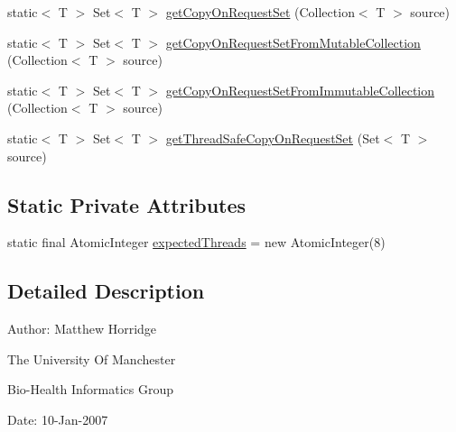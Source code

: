 \begin{DoxyCompactItemize}
\item 
static$<$ T $>$ Set$<$ T $>$ \hyperlink{classorg_1_1semanticweb_1_1owlapi_1_1util_1_1_collection_factory_a0e595699beb90abc066458d92cf2497f}{get\-Copy\-On\-Request\-Set} (Collection$<$ T $>$ source)
\item 
static$<$ T $>$ Set$<$ T $>$ \hyperlink{classorg_1_1semanticweb_1_1owlapi_1_1util_1_1_collection_factory_ac55d705380ba53720429668722bf91d1}{get\-Copy\-On\-Request\-Set\-From\-Mutable\-Collection} (Collection$<$ T $>$ source)
\item 
static$<$ T $>$ Set$<$ T $>$ \hyperlink{classorg_1_1semanticweb_1_1owlapi_1_1util_1_1_collection_factory_a0527b3848425d1fdc2b1dff368d02271}{get\-Copy\-On\-Request\-Set\-From\-Immutable\-Collection} (Collection$<$ T $>$ source)
\item 
static$<$ T $>$ Set$<$ T $>$ \hyperlink{classorg_1_1semanticweb_1_1owlapi_1_1util_1_1_collection_factory_a97abde2e1533f7248d054ae6fb4cbdb6}{get\-Thread\-Safe\-Copy\-On\-Request\-Set} (Set$<$ T $>$ source)
\end{DoxyCompactItemize}
\subsection*{Static Private Attributes}
\begin{DoxyCompactItemize}
\item 
static final Atomic\-Integer \hyperlink{classorg_1_1semanticweb_1_1owlapi_1_1util_1_1_collection_factory_ade50ba4ac53f344db4906671a2a5ec0c}{expected\-Threads} = new Atomic\-Integer(8)
\end{DoxyCompactItemize}


\subsection{Detailed Description}
Author\-: Matthew Horridge\par
 The University Of Manchester\par
 Bio-\/\-Health Informatics Group\par
 Date\-: 10-\/\-Jan-\/2007\par
 \par
 

